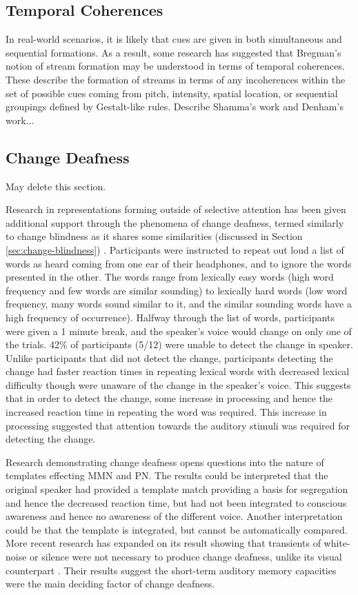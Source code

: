 \documentclass[a4paper,11pt,final]{ThesisStyle}
\begin{document}
\subsection{Temporal Coherences}

In real-world scenarios, it is likely that cues are given in both simultaneous and sequential formations.  As a result, some research has suggested that Bregman's notion of stream formation may be understood in terms of temporal coherences.  These describe the formation of streams in terms of any incoherences within the set of possible cues coming from pitch, intensity, spatial location, or sequential groupings defined by Gestalt-like rules.  Describe Shamma's work and Denham's work...


\subsection{Change Deafness}

May delete this section.

Research in representations forming outside of selective attention has been given additional support through the phenomena of change deafness, termed similarly to change blindness as it shares some similarities (discussed in Section \ref{sec:change-blindness}) \cite{Vitevitch2000}.  Participants were instructed to repeat out loud a list of words as heard coming from one ear of their headphones, and to ignore the words presented in the other.  The words range from lexically easy words (high word frequency and few words are similar sounding) to lexically hard words (low word frequency, many words sound similar to it, and the similar sounding words have a high frequency of occurrence).  Halfway through the list of words, participants were given a 1 minute break, and the speaker's voice would change on only one of the trials.  42\% of participants (5/12) were unable to detect the change in speaker.  Unlike participants that did not detect the change, participants detecting the change had faster reaction times in repeating lexical words with decreased lexical difficulty though were unaware of the change in the speaker's voice.  This suggests that in order to detect the change, some increase in processing and hence the increased reaction time in repeating the word was required.  This increase in processing suggested that attention towards the auditory stimuli was required for detecting the change.  

Research demonstrating change deafness opens questions into the nature of templates effecting MMN and PN.  The results could be interpreted that the original speaker had provided a template match providing a basis for segregation and hence the decreased reaction time, but had not been integrated to conscious awareness and hence no awareness of the different voice.  Another interpretation could be that the template is integrated, but cannot be automatically compared.  More recent research has expanded on its result showing that transients of white-noise or silence were not necessary to produce change deafness, unlike its visual counterpart \cite{TURATTO2008}.  Their results suggest the short-term auditory memory capacities were the main deciding factor of change deafness.  
\end{document}
